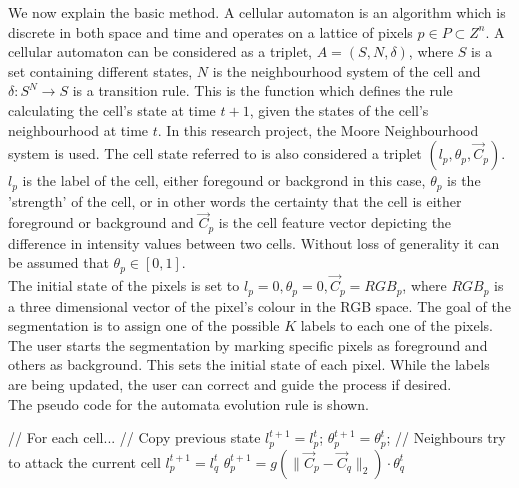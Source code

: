 \documentclass[a4paper,10pt]{article}
\begin{document}
\noindent We now explain the basic method\cite{alg}.  A
cellular automaton is an algorithm which is discrete in both space and time
and operates on a lattice of pixels $p \in P \subset Z^{n}$.  A cellular
automaton can be considered as a triplet, $A = (S, N, \delta)$, where $S$ is a
set containing different states, $N$ is the
neighbourhood system of the cell and $\delta: S^{N} \rightarrow S $ is a
transition rule.  This is the function which defines  the rule calculating the
cell's state at time $t + 1$, given the states 
of the cell's neighbourhood at time $t$.  In this research project, the Moore 
Neighbourhood system is used.  The cell state referred to
is also
considered a triplet $(l_{p}, \theta_{p}, \overrightarrow{C}_{p})$.
$l_{p}$ is the label of the cell, either foregound or backgrond in this case, $\theta_{p}$ is the
'strength' of the cell, or in other words the certainty that the cell is either foreground or background and $\overrightarrow{C}_{p}$ is
the cell feature vector depicting the difference in intensity values between two cells.  Without loss of generality it can be assumed that
$\theta_{p} \in [0,1]$.  \\

The initial state of the pixels is set to $l_{p} = 0, \theta_{p} = 0,
\overrightarrow{C}_{p} = RGB_{p}$, where $RGB_{p}$ is a three dimensional vector
of the pixel's colour in 
the RGB space.  The goal of the segmentation is to assign one of the possible
$K$ labels to each one of the pixels.  The user starts the segmentation by
marking specific pixels as foreground and others as background.  This sets the
initial state of each pixel.  While the labels are being updated, the user can
correct and guide the process if desired.  \\

\noindent The pseudo code for the automata evolution rule is shown\cite{alg}.
\begin{algorithm}[H]
\begin{algorithmic}[1]
 \State // For each cell...
 \State // Copy previous state
 \State $l^{t+1}_{p} = l^{t}_{p}$;
 \State $\theta_{p}^{t+1} = \theta_{p}^{t}$;
 \State // Neighbours try to attack the current cell
 \State $l^{t+1}_{p} = l^{t}_{q}$
 \State $\theta^{t+1}_{p} = g(\| \overrightarrow{C}_{p} - \overrightarrow{C}_{q}
\|_{2}) \cdot \theta^{t}_{q}$
 \EndIf
 \EndFor
 \EndFor
\end{algorithmic}
\end{algorithm}
\end{document}
